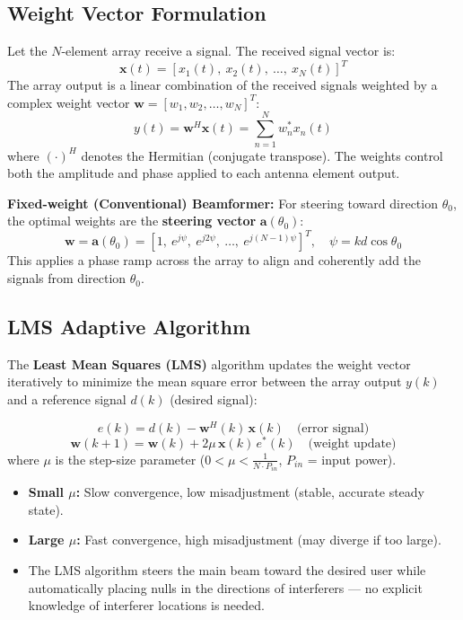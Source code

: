 \documentclass[12pt,a4paper]{article}
\begin{document}
\subsection{Weight Vector Formulation}
Let the $N$-element array receive a signal. The received signal vector is:
\[
\mathbf{x}(t) = [x_1(t),\ x_2(t),\ \dots,\ x_N(t)]^T
\]
The array output is a linear combination of the received signals weighted by a complex weight vector $\mathbf{w} = [w_1, w_2, \dots, w_N]^T$:
\[
y(t) = \mathbf{w}^H \mathbf{x}(t) = \sum_{n=1}^{N} w_n^* x_n(t)
\]
where $(\cdot)^H$ denotes the Hermitian (conjugate transpose). The weights control both the amplitude and phase applied to each antenna element output.

\textbf{Fixed-weight (Conventional) Beamformer:} For steering toward direction $\theta_0$, the optimal weights are the \textbf{steering vector} $\mathbf{a}(\theta_0)$:
\[
\mathbf{w} = \mathbf{a}(\theta_0) = [1,\ e^{j\psi},\ e^{j2\psi},\ \dots,\ e^{j(N-1)\psi}]^T, \quad \psi = kd\cos\theta_0
\]
This applies a phase ramp across the array to align and coherently add the signals from direction $\theta_0$.

\subsection{LMS Adaptive Algorithm}
The \textbf{Least Mean Squares (LMS)} algorithm updates the weight vector iteratively to minimize the mean square error between the array output $y(k)$ and a reference signal $d(k)$ (desired signal):

\begin{tcolorbox}[formulabox, title={\textbf{LMS Weight Update Rule}}]
\[
e(k) = d(k) - \mathbf{w}^H(k)\,\mathbf{x}(k) \quad \text{(error signal)}
\]
\[
\mathbf{w}(k+1) = \mathbf{w}(k) + 2\mu\, \mathbf{x}(k)\, e^*(k) \quad \text{(weight update)}
\]
where $\mu$ is the step-size parameter ($0 < \mu < \frac{1}{N \cdot P_{in}}$, $P_{in}$ = input power).
\end{tcolorbox}

\begin{itemize}[leftmargin=*, itemsep=2pt]
  \item \textbf{Small $\mu$:} Slow convergence, low misadjustment (stable, accurate steady state).
  \item \textbf{Large $\mu$:} Fast convergence, high misadjustment (may diverge if too large).
  \item The LMS algorithm steers the main beam toward the desired user while automatically placing nulls in the directions of interferers — no explicit knowledge of interferer locations is needed.
\end{itemize}
\end{document}
